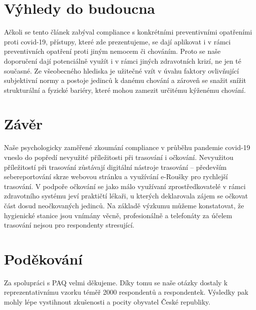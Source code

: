 \section*{Výhledy do budoucna }

Ačkoli se tento článek zabýval compliance s konkrétními preventivními opatřeními proti covid-19, přístupy, které zde prezentujeme, se dají aplikovat i v rámci preventivních opatření proti jiným nemocem či chováním. Proto se naše doporučení dají potenciálně využít i v rámci jiných zdravotních krizí, ne jen té současné. Ze všeobecného hlediska je užitečné vzít v úvahu faktory ovlivňující subjektivní normy a postoje jedinců k danému chování a zároveň se snažit snížit strukturální a fyzické bariéry, které mohou zamezit určitému kýženému chování. 

\section*{Závěr}

Naše psychologicky zaměřené zkoumání compliance v průběhu pandemie covid-19 vneslo do popředí nevyužité příležitosti při trasování i očkování. Nevyužitou příležitostí při trasování zůstávají digitální nástroje trasování -- především sebereportování skrze webovou stránku a využívání e-Roušky pro rychlejší trasování. V podpoře očkování se jako málo využívaní zprostředkovatelé v rámci zdravotního systému jeví praktičtí lékaři, u kterých deklarovala zájem se očkovat část dosud neočkovaných jedinců. Na základě výzkumu můžeme konstatovat, že hygienické stanice jsou vnímány věcně, profesionálně a telefonáty za účelem trasování nejsou pro respondenty stresující. 

\section*{Poděkování}

Za spolupráci s PAQ velmi děkujeme. Díky tomu se naše otázky dostaly k reprezentativnímu vzorku téměř 2000 respondentů a respondentek. Výsledky pak mohly lépe vystihnout zkušenosti a pocity obyvatel České republiky.